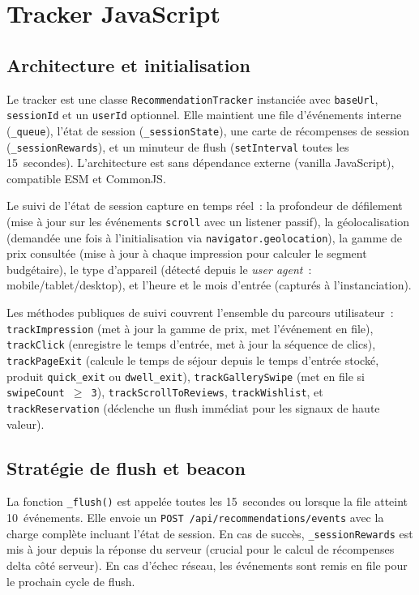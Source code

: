 \section{Tracker JavaScript}

\subsection{Architecture et initialisation}

Le tracker est une classe \texttt{RecommendationTracker} instanciée avec \texttt{baseUrl},
\texttt{sessionId} et un \texttt{userId} optionnel. Elle maintient une file d'événements
interne (\texttt{\_queue}), l'état de session (\texttt{\_sessionState}), une carte de
récompenses de session (\texttt{\_sessionRewards}), et un minuteur de flush
(\texttt{setInterval} toutes les 15~secondes). L'architecture est sans dépendance externe
(vanilla JavaScript), compatible ESM et CommonJS.

Le suivi de l'état de session capture en temps réel~: la profondeur de défilement (mise à
jour sur les événements \texttt{scroll} avec un listener passif), la géolocalisation
(demandée une fois à l'initialisation via \texttt{navigator.geolocation}), la gamme de prix
consultée (mise à jour à chaque impression pour calculer le segment budgétaire), le type
d'appareil (détecté depuis le \textit{user agent}~: mobile/tablet/desktop), et l'heure et
le mois d'entrée (capturés à l'instanciation).

Les méthodes publiques de suivi couvrent l'ensemble du parcours utilisateur~:
\texttt{trackImpression} (met à jour la gamme de prix, met l'événement en file),
\texttt{trackClick} (enregistre le temps d'entrée, met à jour la séquence de clics),
\texttt{trackPageExit} (calcule le temps de séjour depuis le temps d'entrée stocké, produit
\texttt{quick\_exit} ou \texttt{dwell\_exit}), \texttt{trackGallerySwipe} (met en file si
\texttt{swipeCount $\geq$ 3}), \texttt{trackScrollToReviews}, \texttt{trackWishlist}, et
\texttt{trackReservation} (déclenche un flush immédiat pour les signaux de haute valeur).


\subsection{Stratégie de flush et beacon}

La fonction \texttt{\_flush()} est appelée toutes les 15~secondes ou lorsque la file atteint
10~événements. Elle envoie un \texttt{POST /api/recommendations/events} avec la charge
complète incluant l'état de session. En cas de succès, \texttt{\_sessionRewards} est mis à
jour depuis la réponse du serveur (crucial pour le calcul de récompenses delta côté serveur).
En cas d'échec réseau, les événements sont remis en file pour le prochain cycle de flush.

